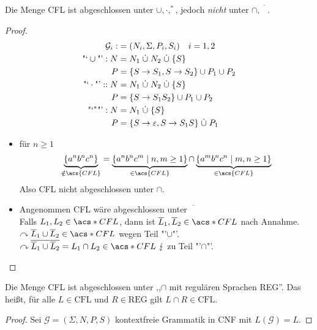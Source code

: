 {\begin{Satz} %
  \label{thm:cfl-closed-reg-intersect}
	Die Menge \acs{CFL} ist abgeschlossen unter $\cup, \cdot, ^*$, jedoch \emph{nicht} unter $\cap, \overline{\phantom{A}}$.
\end{Satz}
\begin{proof}
	\begin{align*}
		\mathcal{G}_i :&= (N_i, \Sigma,P_i,S_i) \quad i=1,2\\
		\text{"`}\cup\text{"'}: N &= N_1\dotcup N_2\dotcup\{S\}\\
		P &= \{S\->S_1, S\->S_2 \} \cup P_1\cup P_2\\
		\text{"`}\cdot\text{"'}:: N &= N_1\dotcup N_2\dotcup\{S\}\\
		P &= \{ S\->S_1S_2 \} \cup P_1\cup P_2\\
		\text{"`}^*\text{"'}: N &= N_1 \dotcup \{S\}\\
		P &= \{ S\->\Eps, S\-> S_1S \} \dotcup P_1
	\end{align*}
	\begin{itemize}
	\item für $n\geq 1$
		\[ \underbrace{\{a^nb^nc^n\}}_{\notin \acs{CFL}} = \underbrace{\{a^nb^nc^m \mid n,m\geq 1 \}}_{\in \acs{CFL}} \cap \underbrace{\{a^mb^nc^n \mid m,n\geq 1 \}}_{\in \acs{CFL}} \]
		Also \ac{CFL} nicht abgeschlossen unter $\cap$.
	\item Angenommen CFL wäre abgeschlossen unter $\overline{\phantom{X}}$\\
		Falls $L_1,L_2\in \acs*{CFL}$, dann ist $\overline{L}_1,\overline{L}_2\in\acs*{CFL}$ nach Annahme.\\
		$\curvearrowright \overline{L}_1\cup \overline{L}_2\in\acs*{CFL}$ wegen Teil "'$\cup$"'.\\
		$\curvearrowright \overline{\overline{L}_1\cup \overline{L}_2} = L_1\cap L_2\in\acs*{CFL}\ \lightning$ zu Teil "'$\cap$"'. \qedhere
	\end{itemize}
\end{proof}

\begin{Satz} %
	Die Menge \ac{CFL} ist abgeschlossen unter ,,$\cap$ mit regulären Sprachen REG''.
  Das heißt, für alle $L \in \mathrm{CFL}$ und $R \in \mathrm{REG}$ gilt $L \cap R \in \mathrm{CFL}$.
\end{Satz}
\begin{proof}
  Sei $\mathcal{G} = (\Sigma, N, P, S)$ kontextfreie Grammatik in CNF mit $L(\mathcal{G}) = L$.


\end{proof}}
